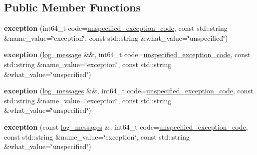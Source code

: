 \subsection*{Public Member Functions}
\begin{DoxyCompactItemize}
\item 
\mbox{\label{classfc_1_1exception_a438cb875c834068b29e0a6cd3319e7f3}} 
{\bfseries exception} (int64\+\_\+t code=\mbox{\hyperlink{namespacefc_ab52b42f18c442a260897c74c66c3d35ca54c3c8b9caa13270a23c57af7bf9c52c}{unspecified\+\_\+exception\+\_\+code}}, const std\+::string \&name\+\_\+value=\char`\"{}exception\char`\"{}, const std\+::string \&what\+\_\+value=\char`\"{}unspecified\char`\"{})
\item 
\mbox{\label{classfc_1_1exception_af4312be4f267fda7b0bf8bccbfac232b}} 
{\bfseries exception} (\mbox{\hyperlink{classfc_1_1log__message}{log\+\_\+message}} \&\&, int64\+\_\+t code=\mbox{\hyperlink{namespacefc_ab52b42f18c442a260897c74c66c3d35ca54c3c8b9caa13270a23c57af7bf9c52c}{unspecified\+\_\+exception\+\_\+code}}, const std\+::string \&name\+\_\+value=\char`\"{}exception\char`\"{}, const std\+::string \&what\+\_\+value=\char`\"{}unspecified\char`\"{})
\item 
\mbox{\label{classfc_1_1exception_a536774ba4cc639d3215bd91f412ffded}} 
{\bfseries exception} (\mbox{\hyperlink{classstd_1_1vector}{log\+\_\+messages}} \&\&, int64\+\_\+t code=\mbox{\hyperlink{namespacefc_ab52b42f18c442a260897c74c66c3d35ca54c3c8b9caa13270a23c57af7bf9c52c}{unspecified\+\_\+exception\+\_\+code}}, const std\+::string \&name\+\_\+value=\char`\"{}exception\char`\"{}, const std\+::string \&what\+\_\+value=\char`\"{}unspecified\char`\"{})
\item 
\mbox{\label{classfc_1_1exception_a57f2149839df7dc42ee356ca62a2dc90}} 
{\bfseries exception} (const \mbox{\hyperlink{classstd_1_1vector}{log\+\_\+messages}} \&, int64\+\_\+t code=\mbox{\hyperlink{namespacefc_ab52b42f18c442a260897c74c66c3d35ca54c3c8b9caa13270a23c57af7bf9c52c}{unspecified\+\_\+exception\+\_\+code}}, const std\+::string \&name\+\_\+value=\char`\"{}exception\char`\"{}, const std\+::string \&what\+\_\+value=\char`\"{}unspecified\char`\"{})
\item 
\mbox{\label{classfc_1_1exception_ae8accd0c86f53a5f0c0c473609b642dc}} 

\end{DoxyCompactItemize}
